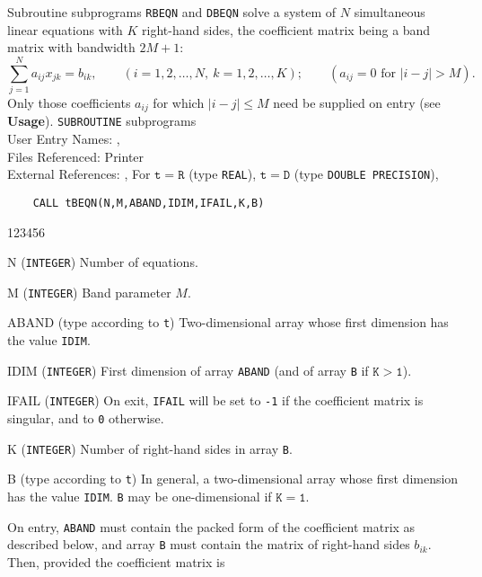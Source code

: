                         
                   
\Submitter{}                             
                       
Subroutine  subprograms {\tt RBEQN} and {\tt DBEQN} solve a system of
$N$ simultaneous linear equations with $K$ right-hand sides, the
coefficient matrix being a band matrix with bandwidth $2M+1$:
$$ \sum^N_{j=1}a_{ij} x_{jk} = b_{ik},\qquad (i=1,2,\ldots,N, \
k=1,2,\ldots,K); \qquad
(a_{ij} = 0 \mbox{\ for\ } |i-j| > M).$$
Only those coefficients $a_{ij}$ for which $|i-j|\le M$
need be supplied on entry (see {\bf Usage}).
\Structure
{\tt SUBROUTINE}  subprograms \\
User Entry Names: , \\
Files Referenced: Printer\\
External References: , 
\Usage
For $\mathtt{t=R}$ (type {\tt REAL}), $\mathtt{t=D}$ (type
{\tt DOUBLE PRECISION}),
\begin{verbatim}
    CALL tBEQN(N,M,ABAND,IDIM,IFAIL,K,B)
\end{verbatim}
\begin{DLtt}{123456}
\item [N]({\tt INTEGER}) Number of equations.
\item [M]({\tt INTEGER}) Band parameter $M$.
\item [ABAND] (type according to {\tt t}) Two-dimensional array whose
first dimension has the value {\tt IDIM}.
\item [IDIM]({\tt INTEGER}) First dimension of array {\tt ABAND}
(and of array {\tt B} if $\mathtt{K>1}$).
\item [IFAIL]({\tt INTEGER}) On exit, {\tt IFAIL} will be set to
{\tt -1} if the coefficient matrix is singular, and to {\tt 0} otherwise.
\item [K]({\tt INTEGER}) Number of right-hand sides in array {\tt B}.
\item[B] (type according to {\tt t}) In general, a two-dimensional array
whose first dimension has the value {\tt IDIM}. {\tt B} may be
one-dimensional if $\mathtt{K=1}$.
\end{DLtt}
\par
On entry, {\tt ABAND} must contain the packed form of the coefficient
matrix as described below, and array {\tt B} must contain the matrix of
right-hand sides $b_{ik}$. Then, provided the coefficient matrix is
